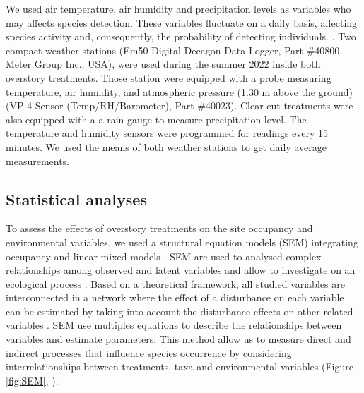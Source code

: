 We used air temperature, air humidity and precipitation levels as variables who may affects species detection.
These variables fluctuate on a daily basis, affecting species activity and, consequently, the probability of detecting individuals. 
\citep{butterfieldCarabidLifeCycle1996,kotzeFortyYearsCarabid2011a,loveiEcologyBehaviorGround1996,odonnellPredictingVariationMicrohabitat2014a,spotilaRoleTemperatureWater1972}.
Two compact weather stations (Em50 Digital Decagon Data Logger, Part \#40800, Meter Group Inc., USA), were used during the summer 2022 inside both overstory treatments.
Those station were equipped with a probe measuring temperature, air humidity, and atmospheric pressure (1.30 m above the ground)(VP-4 Sensor (Temp/RH/Barometer), Part \#40023). 
Clear-cut treatments were also equipped with a a rain gauge to measure precipitation level. 
The temperature and humidity sensors were programmed for readings every 15 minutes. 
We used the means of both weather stations to get daily average measurements.

\subsection*{Statistical analyses}
\label{subsec:analyses}

To assess the effects of overstory treatments on the site occupancy and environmental variables, we used a structural equation models (SEM) integrating occupancy and linear mixed models \citep{graceSpecificationStructuralEquation2010,josephIntegratingOccupancyModels2016,mackenzieOccupancyEstimationModeling2006a}.
SEM are used to analysed complex relationships among observed and latent variables and allow to investigate on an ecological process \citep{graceStructuralEquationModeling2008}.
Based on a theoretical framework, all studied variables are interconnected in a network where the effect of a disturbance on each variable can be estimated by taking into account 
the disturbance effects on other related variables \citep{graceStructuralEquationModeling2008}.
SEM use multiples equations to describe the relationships between variables and estimate parameters.
This method allow us to measure direct and indirect processes that influence species occurrence by considering interrelationships between treatments, taxa and environmental variables (Figure \ref*{fig:SEM}, \citealp{graceSpecificationStructuralEquation2010}).

\vspace{1cm}

